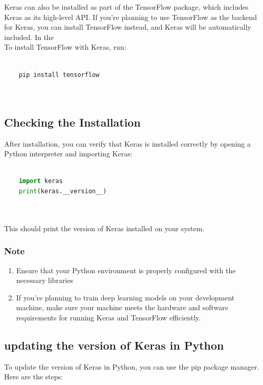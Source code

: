 Keras can also be installed as part of the TensorFlow package, which includes Keras as its high-level API. If you're planning to use TensorFlow as the backend for Keras, you can install TensorFlow instead, and Keras will be automatically included. In the \\To install TensorFlow with Keras, run:

\begin{lstlisting}[language=Python]
	
	pip install tensorflow
	
	
\end{lstlisting}


\subsection{Checking the Installation}

After installation, you can verify that Keras is installed correctly by opening a Python interpreter and importing Keras:

\begin{lstlisting}[language=Python]
	
	import keras
	print(keras.__version__)
	
	
\end{lstlisting}
This should print the version of Keras installed on your system.\cite{Keinstall:2024}

\subsubsection{Note}

\begin{enumerate}
	\item Ensure that your Python environment is properly configured with the necessary libraries
	
	\item If you're planning to train deep learning models on your development machine, make sure your machine meets the hardware and software requirements for running Keras and TensorFlow efficiently.
	
\end{enumerate}

	\subsection{updating the version of Keras in Python}

To update the version of Keras in Python, you can use the pip package manager. Here are the steps:



